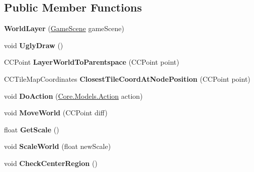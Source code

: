 \subsection*{Public Member Functions}
\begin{DoxyCompactItemize}
\item 
\hypertarget{classClient_1_1Common_1_1Views_1_1WorldLayer_ada890fb7de1fd3eb6f22db5922c3b3c6}{{\bfseries World\-Layer} (\hyperlink{classClient_1_1Common_1_1Views_1_1GameScene}{Game\-Scene} game\-Scene)}\label{classClient_1_1Common_1_1Views_1_1WorldLayer_ada890fb7de1fd3eb6f22db5922c3b3c6}

\item 
\hypertarget{classClient_1_1Common_1_1Views_1_1WorldLayer_a9c8d0ab2c10ac9444749d61ccb1eb13e}{void {\bfseries Ugly\-Draw} ()}\label{classClient_1_1Common_1_1Views_1_1WorldLayer_a9c8d0ab2c10ac9444749d61ccb1eb13e}

\item 
\hypertarget{classClient_1_1Common_1_1Views_1_1WorldLayer_a9d6b9089fd6dbee086d2d29979654453}{C\-C\-Point {\bfseries Layer\-World\-To\-Parentspace} (C\-C\-Point point)}\label{classClient_1_1Common_1_1Views_1_1WorldLayer_a9d6b9089fd6dbee086d2d29979654453}

\item 
\hypertarget{classClient_1_1Common_1_1Views_1_1WorldLayer_a78ba26390dbd8846292d5ddaf7498d2f}{C\-C\-Tile\-Map\-Coordinates {\bfseries Closest\-Tile\-Coord\-At\-Node\-Position} (C\-C\-Point point)}\label{classClient_1_1Common_1_1Views_1_1WorldLayer_a78ba26390dbd8846292d5ddaf7498d2f}

\item 
\hypertarget{classClient_1_1Common_1_1Views_1_1WorldLayer_ac15c64e5bcea6628c8826233fbfe7441}{void {\bfseries Do\-Action} (\hyperlink{classCore_1_1Models_1_1Action}{Core.\-Models.\-Action} action)}\label{classClient_1_1Common_1_1Views_1_1WorldLayer_ac15c64e5bcea6628c8826233fbfe7441}

\item 
\hypertarget{classClient_1_1Common_1_1Views_1_1WorldLayer_ae05e7392f00366f82975cdbb98888ff7}{void {\bfseries Move\-World} (C\-C\-Point diff)}\label{classClient_1_1Common_1_1Views_1_1WorldLayer_ae05e7392f00366f82975cdbb98888ff7}

\item 
\hypertarget{classClient_1_1Common_1_1Views_1_1WorldLayer_a461a75adc0ce851c50c6e404bb0cc9bc}{float {\bfseries Get\-Scale} ()}\label{classClient_1_1Common_1_1Views_1_1WorldLayer_a461a75adc0ce851c50c6e404bb0cc9bc}

\item 
\hypertarget{classClient_1_1Common_1_1Views_1_1WorldLayer_afb5fdabd309821659a05293f3a19f9cf}{void {\bfseries Scale\-World} (float new\-Scale)}\label{classClient_1_1Common_1_1Views_1_1WorldLayer_afb5fdabd309821659a05293f3a19f9cf}

\item 
\hypertarget{classClient_1_1Common_1_1Views_1_1WorldLayer_a721d2e25aad2d8043fb9d266469ed512}{void {\bfseries Check\-Center\-Region} ()}\label{classClient_1_1Common_1_1Views_1_1WorldLayer_a721d2e25aad2d8043fb9d266469ed512}

\end{DoxyCompactItemize}

